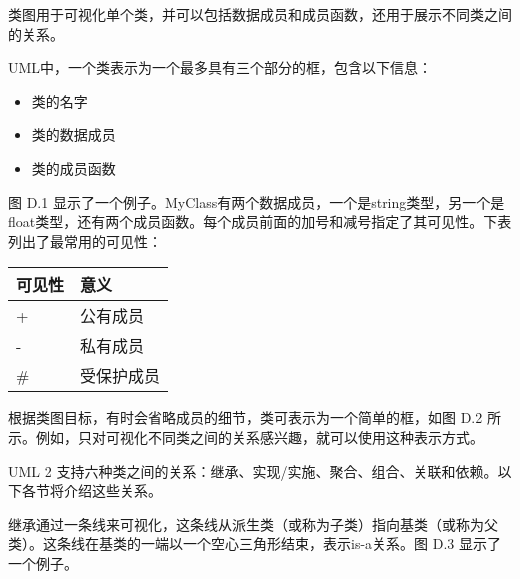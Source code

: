 类图用于可视化单个类，并可以包括数据成员和成员函数，还用于展示不同类之间的关系。


UML中，一个类表示为一个最多具有三个部分的框，包含以下信息：

\begin{itemize}
\item
类的名字

\item
类的数据成员

\item
类的成员函数
\end{itemize}

图 D.1 显示了一个例子。MyClass有两个数据成员，一个是string类型，另一个是float类型，还有两个成员函数。每个成员前面的加号和减号指定了其可见性。下表列出了最常用的可见性：


\begin{longtable}{|l|l|}
\hline
\textbf{可见性} & \textbf{意义} \\ \hline
\endfirsthead
%
\endhead
%
+                   & 公有成员    \\ \hline
-                   & 私有成员   \\ \hline
\#                  & 受保护成员 \\ \hline
\end{longtable}

根据类图目标，有时会省略成员的细节，类可表示为一个简单的框，如图 D.2 所示。例如，只对可视化不同类之间的关系感兴趣，就可以使用这种表示方式。



UML 2 支持六种类之间的关系：继承、实现/实施、聚合、组合、关联和依赖。以下各节将介绍这些关系。


继承通过一条线来可视化，这条线从派生类（或称为子类）指向基类（或称为父类）。这条线在基类的一端以一个空心三角形结束，表示is-a关系。图 D.3 显示了一个例子。


